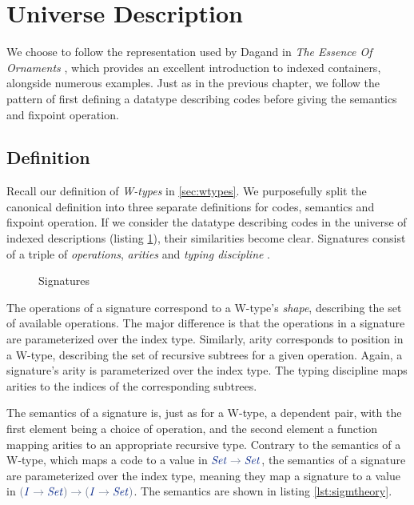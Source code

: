 \documentclass[a4paper,msc,twosized=semi]{uustthesis}
\newenvironment{listing}[2] %
{
    \begin{figure}[h]
      \label{#2}
      \begin{framed}
        \caption{#1}
}
{
      \end{framed}
    \end{figure}
}
\newcommand{\includeagdanc}[2]{\ExecuteMetaData[../src/chap0#1/latex/code.tex]{#2}\vspace*{-0.35cm}}
\newcommand{\includeagdalisting}[4]{
  \begin{listing}{#3}{#4} 
    \includeagdanc{#1}{#2}
  \end{listing} 
}
\newcommand*{\mathcolor}{}
\def\mathcolor#1#{\mathcoloraux{#1}}
\newcommand*{\mathcoloraux}[3]{%
  \protect\leavevmode
  \begingroup
    \color#1{#2}#3%
  \endgroup
}
\newcommand{\HSSpecial}[1]{\mathcolor{hsblue4}{#1}}
\newcommand{\HSSym}[1]{\mathcolor{hsblue4}{#1}}
\newcommand{\HSCon}[1]{\mathcolor{hsblue3}{\mathit{#1}}}
\begin{document}
\section{Universe Description}

  We choose to follow the representation used by Dagand in \emph{The Essence Of Ornaments} \cite{dagand2017essence}, which provides an excellent introduction to indexed containers, alongside numerous examples. Just as in the previous chapter, we follow the pattern of first defining a datatype describing codes before giving the semantics and fixpoint operation. 

\subsection{Definition}

  Recall our definition of \emph{W-types} in \cref{sec:wtypes}. We purposefully split the canonical definition into three separate definitions for codes, semantics and fixpoint operation. If we consider the datatype describing codes in the universe of indexed descriptions (listing \ref{lst:signatures}), their similarities become clear. Signatures consist of a triple of \emph{operations}, \emph{arities} and \emph{typing discipline} .

\includeagdalisting{6}{signature}{Signatures}{lst:signatures}

  The operations of a signature correspond to a W-type's \emph{shape}, describing the set of available operations. The major difference is that the operations in a signature are parameterized over the index type. Similarly, arity corresponds to position in a W-type, describing the set of recursive subtrees for a given operation. Again, a signature's arity is parameterized over the index type. The typing discipline maps arities to the indices of the corresponding subtrees. 

  The semantics of a signature is, just as for a W-type, a dependent pair, with the first element being a choice of operation, and the second element a function mapping arities to an appropriate recursive type. Contrary to the semantics of a W-type, which maps a code to a value in \ensuremath{\HSCon{Set}\HSSym{\to} \HSCon{Set}}, the semantics of a signature are parameterized over the index type, meaning they map a signature to a value in \ensuremath{\HSSpecial{(}\HSCon{I}\HSSym{\to} \HSCon{Set}\HSSpecial{)}\HSSym{\to} \HSSpecial{(}\HSCon{I}\HSSym{\to} \HSCon{Set}\HSSpecial{)}}. The semantics are shown in listing \ref{lst:sigmtheory}. 
\end{document}
